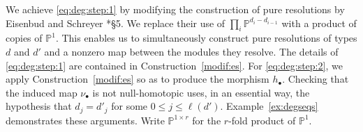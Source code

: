 \documentclass[12pt]{amsart}
\theoremstyle{definition}
\newcommand{\PP}{\mathbb{P}}
\begin{document}
We achieve \eqref{eq:deg:step:1} by modifying the construction of pure
resolutions by Eisenbud and Schreyer \cite{EiScConjOfBS07}*{\S5}.  
We replace their use of $\prod_i \PP^{d_i - d_{i-1}}$ with a product of
copies of $\PP^1$.  This enables us to simultaneously 
construct pure resolutions of types 
$d$ and $d'$ and a nonzero map between the modules they resolve.  The
details of \eqref{eq:deg:step:1} are contained in
Construction~\ref{modif:es}.  For \eqref{eq:deg:step:2}, we 
apply Construction~\ref{modif:es} so as to produce the morphism $h_\bullet$.
Checking that the induced map $\nu_\bullet$ is not null-homotopic 
uses, in an essential way, the hypothesis that $d_j = d'_j$ for some $0
\leq j \leq \ell(d')$.  Example~\ref{ex:degseqs} demonstrates these
arguments. Write $\PP^{1 \times r}$ for the $r$-fold product of
$\PP^1$.
\end{document}
